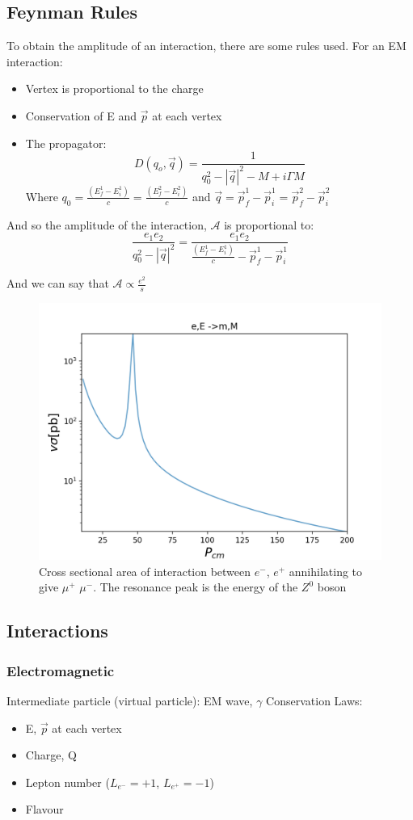 \documentclass[11pt,a4paper]{article}
\begin{document}
\subsection{Feynman Rules}
To obtain the amplitude of an interaction, there are some rules used. For an EM interaction:
\begin{itemize}
    \item Vertex is proportional to the charge
    \item Conservation of E and $\vec{p}$ at each vertex
    \item The propagator: 
        \begin{equation}
            D(q_o, \vec{q}) = \frac{1}{q_0^2 - |\vec{q}|^2 - M + i\Gamma M}
        \end{equation}
        Where $q_0 = \frac{(E^1 _f - E^1 _i)}{c} = \frac{(E^2 _f - E^2 _i)}{c}$
        and $\vec{q} = \vec{p}^1_f - \vec{p}^1_i = \vec{p}^2_f - \vec{p}^2_i$
\end{itemize}
And so the amplitude of the interaction, $\mathscr{A}$ is proportional to:
\begin{equation}
    \frac{e_1 e_2}{q_0^2 - |\vec{q}|^2} = \frac{e_1 e_2}{\frac{(E^1 _f - E^1 _i)}{c} - \vec{p}^1_f - \vec{p}^1_i}
\end{equation}

And we can say that $\mathscr{A} \propto \frac{e^2}{s}$

\begin{figure}[h]
    \centering
    \includegraphics[width=0.5\linewidth]{Documents/Notes/Fig/eE-mM.png}
    \caption{Cross sectional area of interaction between $e^-$, $e^+$ annihilating to give $\mu^+$ $\mu^-$. The resonance peak is the energy of the $Z^0$ boson}
    \label{fig:enter-label}
\end{figure}

\subsection{Interactions}
\subsubsection{Electromagnetic}
Intermediate particle (virtual particle): EM wave, $\gamma$
Conservation Laws:
\begin{itemize}
    \item E, $\vec{p}$ at each vertex
    \item Charge, Q
    \item Lepton number ($L_{e^-} = +1$, $L_{e^+} = -1$)
    \item Flavour
\end{itemize}
\end{document}
